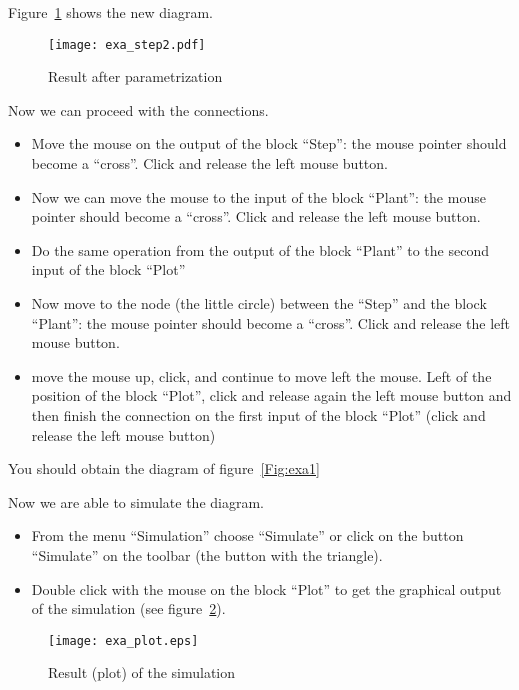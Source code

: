 Figure~\ref{Fig:exa_step2} shows the new diagram.

\begin{figure}[htbp]	%
\centering
\texttt{[image: exa\_step2.pdf]}
\caption{Result after parametrization}
\label{Fig:exa_step2}
\end{figure}

Now we can proceed with the connections.

\begin{itemize}
\item Move the mouse on the output of the block ``Step'': the mouse pointer 
should become a ``cross''. Click and release the left mouse button.
\item Now we can move the mouse to the input of the block ``Plant'': the mouse 
pointer should become a ``cross''. Click and release the left mouse button.
\item Do the same operation from the output of the block ``Plant'' to the 
second input of the block ``Plot''
\item Now move to the node (the little circle) between the ``Step'' and the 
block ``Plant'': the mouse 
pointer should become a ``cross''. Click and release the left mouse button.
\item move the mouse up, click, and continue to move left the mouse. Left of 
the position of the block ``Plot'', click and release again the left mouse 
button and then finish the connection on the first input of the block ``Plot'' 
(click and release the left mouse button)
\end{itemize}

You should obtain the diagram of figure~\ref{Fig:exa1}

Now we are able to simulate the diagram.

\begin{itemize}
\item From the menu ``Simulation'' choose ``Simulate'' or click on the button 
``Simulate'' on the toolbar (the button with the triangle).
\item Double click with the mouse on the block ``Plot'' to get the graphical 
output of the simulation (see figure~\ref{Fig:exaplot}).
\end{itemize}

\begin{figure}[htbp]	%
\centering
\texttt{[image: exa\_plot.eps]}
\caption{Result (plot) of the simulation}
\label{Fig:exaplot}
\end{figure}

